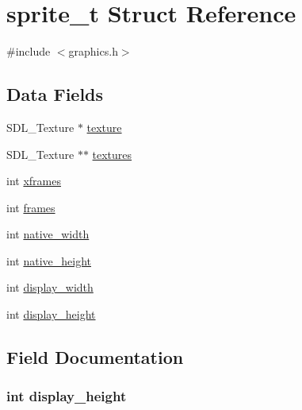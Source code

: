 \hypertarget{structsprite__t}{}\section{sprite\+\_\+t Struct Reference}
\label{structsprite__t}


{\ttfamily \#include $<$graphics.\+h$>$}

\subsection*{Data Fields}
\begin{DoxyCompactItemize}
\item 
S\+D\+L\+\_\+\+Texture $\ast$ \hyperlink{structsprite__t_a859b8efbf9abe8e82757ee5c75a0c97c}{texture}
\item 
S\+D\+L\+\_\+\+Texture $\ast$$\ast$ \hyperlink{structsprite__t_a15dffee77a6e5acc64cce7d08181fca1}{textures}
\item 
int \hyperlink{structsprite__t_a119f0bb9e23dbbf893c65aeb17e1c4ab}{xframes}
\item 
int \hyperlink{structsprite__t_a61217d5bc9d5b446d9c08e7ca401b733}{frames}
\item 
int \hyperlink{structsprite__t_ac67650be0cc85b8e8157f73592456f71}{native\+\_\+width}
\item 
int \hyperlink{structsprite__t_a01de6a7d76660c79af280dc85d37a983}{native\+\_\+height}
\item 
int \hyperlink{structsprite__t_afedb05c4f9e44664c74f86a6aecc62bd}{display\+\_\+width}
\item 
int \hyperlink{structsprite__t_a4d1396d7740006e1ac85a02d5a540767}{display\+\_\+height}
\end{DoxyCompactItemize}


\subsection{Field Documentation}
\subsubsection[{\texorpdfstring{display\+\_\+height}{display_height}}]{\setlength{\rightskip}{0pt plus 5cm}int display\+\_\+height}\hypertarget{structsprite__t_a4d1396d7740006e1ac85a02d5a540767}{}\label{structsprite__t_a4d1396d7740006e1ac85a02d5a540767}

